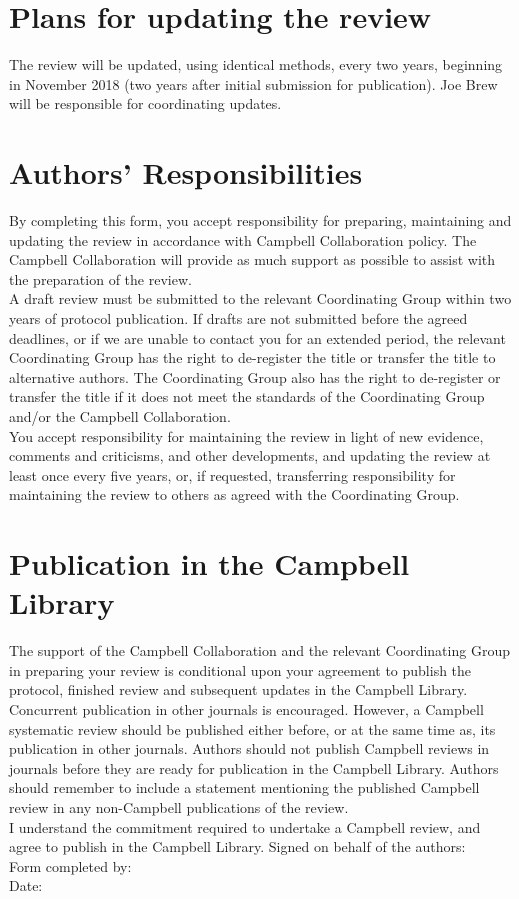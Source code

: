 \documentclass{article}
\begin{document}
\section*{Plans for updating the review} 

The review will be updated, using identical methods, every two years, beginning in November 2018 (two years after initial submission for publication). Joe Brew will be responsible for coordinating updates.

\section*{Authors’ Responsibilities}
By completing this form, you accept responsibility for preparing, maintaining and updating the review in accordance with Campbell Collaboration policy. The Campbell Collaboration will provide as much support as possible to assist with the preparation of the review. \\

\noindent A draft review must be submitted to the relevant Coordinating Group within two years of protocol publication. If drafts are not submitted before the agreed deadlines, or if we are unable to contact you for an extended period, the relevant Coordinating Group has the right to de-register the title or transfer the title to alternative authors. The Coordinating Group also has the right to de-register or transfer the title if it does not meet the standards of the Coordinating Group and/or the Campbell Collaboration. \\

\noindent You accept responsibility for maintaining the review in light of new evidence, comments and criticisms, and other developments, and updating the review at least once every five years, or, if requested, transferring responsibility for maintaining the review to others as agreed with the Coordinating Group.

\section*{Publication in the Campbell Library}

The support of the Campbell Collaboration and the relevant Coordinating Group in preparing your review is conditional upon your agreement to publish the protocol, finished review and subsequent updates in the Campbell Library. Concurrent publication in other journals is encouraged. However, a Campbell systematic review should be published either before, or at the same time as, its publication in other journals. Authors should not publish Campbell reviews in journals before they are ready for publication in the Campbell Library. Authors should remember to include a statement mentioning the published Campbell review in any non-Campbell publications of the review. \\


\noindent I understand the commitment required to undertake a Campbell review, and agree to publish in the Campbell Library. Signed on behalf of the authors: \\

\vspace{10mm}
\noindent Form completed by:\\
\noindent Date: 


{}
  
\end{document}
